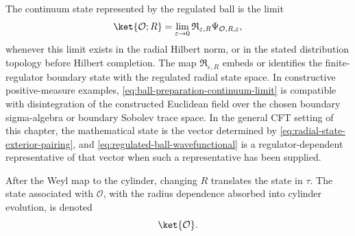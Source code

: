 \begin{definition}
The continuum state represented by the regulated ball is the limit
\begin{equation}
  \ket{\mathcal O;R}
  =
  \lim_{\varepsilon\to0}
  \mathfrak R_{\varepsilon,R}
  \Psi_{\mathcal O,R,\varepsilon},
  \label{eq:ball-preparation-continuum-limit}
\end{equation}
whenever this limit exists in the radial Hilbert norm, or in the stated
distribution topology before Hilbert completion.  The map
\(\mathfrak R_{\varepsilon,R}\) embeds or identifies the finite-regulator
boundary state with the regulated radial state space.  In constructive
positive-measure examples, \eqref{eq:ball-preparation-continuum-limit} is
compatible with disintegration of the constructed Euclidean field over the
chosen boundary sigma-algebra or boundary Sobolev trace space.  In the general
CFT setting of this chapter, the mathematical state is the vector determined
by \eqref{eq:radial-state-exterior-pairing}, and
\eqref{eq:regulated-ball-wavefunctional} is a regulator-dependent
representative of that vector when such a representative has been supplied.
\end{definition}

After the Weyl map to the cylinder, changing \(R\) translates the state in
\(\tau\).  The state associated with \(\mathcal O\), with the radius
dependence absorbed into cylinder evolution, is denoted
\[
  \ket{\mathcal O}.
\]


